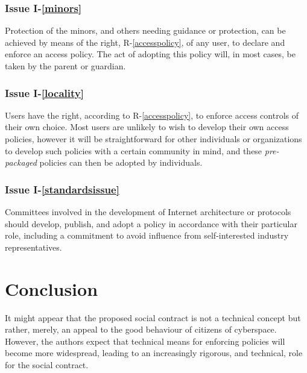 \subsubsection*{Issue I-\ref{minors}}\label{minorssol}

Protection of the minors, and others needing guidance or
protection, can be achieved by means of the right, R-\ref{accesspolicy}, of any
user, to declare and enforce an access policy. The act of adopting
this policy will, in most cases, be taken by the parent or guardian.

\subsubsection*{Issue I-\ref{locality}}\label{localitysol}

Users have the right, according to R-\ref{accesspolicy}, to enforce
access controls of their own choice. Most users are unlikely to wish to
develop their own access policies, however it will be straightforward
for other individuals or organizations to develop such policies with
a certain community in mind, and these {\em pre-packaged} policies
can then be adopted by individuals.


\subsubsection*{Issue I-\ref{standardsissue}}\label{standardssol}

Committees involved in the development of Internet architecture or protocols
should develop, publish, and adopt a policy in accordance with their
particular role, including a commitment to avoid 
influence from self-interested industry representatives.

\section{Conclusion}\label{conc}

It might appear that the proposed social contract is not a technical concept but rather, merely, an appeal to the good behaviour of citizens of cyberspace. However, the authors expect that technical means for enforcing policies will become more widespread, leading to an increasingly rigorous, and technical, role for the social contract.

